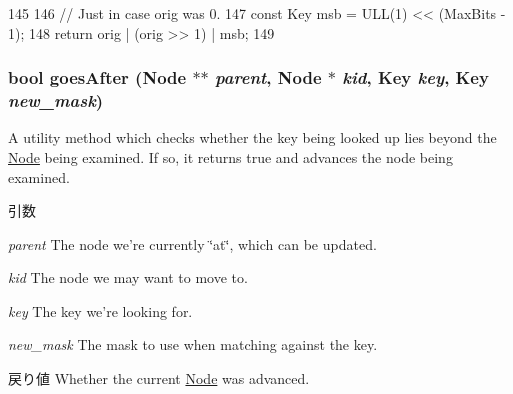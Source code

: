 \begin{DoxyCode}
145     {
146         // Just in case orig was 0.
147         const Key msb = ULL(1) << (MaxBits - 1);
148         return orig | (orig >> 1) | msb;
149     }
\end{DoxyCode}
\hypertarget{classTrie_a119d09ea5d42aaac788297a445aa0e70}{
\subsubsection[{goesAfter}]{\setlength{\rightskip}{0pt plus 5cm}bool goesAfter ({\bf Node} $\ast$$\ast$ {\em parent}, \/  {\bf Node} $\ast$ {\em kid}, \/  Key {\em key}, \/  Key {\em new\_\-mask})}}
\label{classTrie_a119d09ea5d42aaac788297a445aa0e70}
A utility method which checks whether the key being looked up lies beyond the \hyperlink{structTrie_1_1Node}{Node} being examined. If so, it returns true and advances the node being examined. 
\begin{DoxyParams}{引数}
\item[{\em parent}]The node we're currently \char`\"{}at\char`\"{}, which can be updated. \item[{\em kid}]The node we may want to move to. \item[{\em key}]The key we're looking for. \item[{\em new\_\-mask}]The mask to use when matching against the key. \end{DoxyParams}
\begin{DoxyReturn}{戻り値}
Whether the current \hyperlink{structTrie_1_1Node}{Node} was advanced. 
\end{DoxyReturn}



